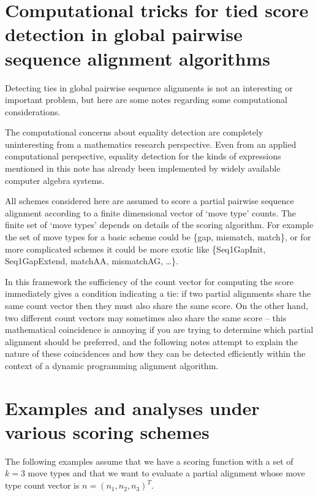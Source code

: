 \documentclass{article}
\begin{document}

\section*{Computational tricks for tied score detection in global pairwise sequence alignment algorithms}

Detecting ties in global pairwise sequence alignments is not an
interesting or important problem, but here are some notes
regarding some computational considerations.

The computational concerns about equality detection
are completely uninteresting from a mathematics research perspective.
Even from an applied computational perspective, equality detection for the
kinds of expressions mentioned in this note has already been
implemented by widely available computer algebra systems.

All schemes considered here are assumed to score a partial
pairwise sequence alignment according to a finite dimensional vector
of `move type' counts.
The finite set of `move types' depends on details of the scoring algorithm.
For example the set of move types for a basic scheme could be
\{gap, mismatch, match\},
or for more complicated schemes it could be more exotic like
\{Seq1GapInit, Seq1GapExtend, matchAA, mismatchAG, \dots\}.

In this framework the sufficiency of the count vector for computing the score
immediately gives a condition indicating a tie:
if two partial alignments share the same count vector
then they must also share the same score.
On the other hand, two different count vectors may
sometimes also share the same score --
this mathematical coincidence is annoying if you are trying to
determine which partial alignment should be preferred,
and the following notes attempt to explain the nature of these
coincidences and how they can be detected efficiently within the
context of a dynamic programming alignment algorithm.

\section*{Examples and analyses under various scoring schemes}

The following examples assume that we have a scoring function with
a set of $k = 3$ move types and that we want to evaluate a partial alignment
whose move type count vector is $n = (n_1, n_2, n_3)^T$.
\end{document}
